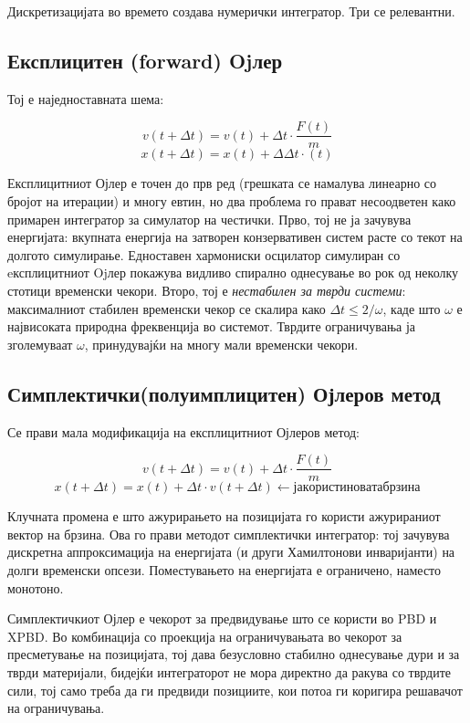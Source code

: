 Дискретизацијата во времето создава нумерички интегратор. Три се релевантни.

\subsection{Експлицитен (forward) Ojлер}
Тој е наједноставната шема:

$$v(t + \Delta t) = v(t) + \Delta t \cdot \frac{F(t)}{m}$$
$$x(t + \Delta t) = x(t) + \Delta Δt \cdot (t)$$

Експлицитниот Ојлер е точен до прв ред (грешката се намалува линеарно со бројот на итерации) и многу евтин, но два проблема го прават несоодветен како примарен интегратор за симулатор на честички. Прво, тој не ја зачувува енергијата: вкупната енергија на затворен конзервативен систем расте со текот на долгото симулирање. Едноставен хармониски осцилатор симулиран со eксплицитниот Ojлер покажува видливо спирално однесување во рок од неколку стотици временски чекори. Второ, тој е \textit{нестабилен за тврди системи}: максималниот стабилен временски чекор се скалира како $\Delta t \leq 2/ω$, каде што $\omega$ е највисоката природна фреквенција во системот. Тврдите ограничувања ја зголемуваат $\omega$, принудувајќи на многу мали временски чекори.

\subsection{Симплектички(полуимплицитен) Ојлеров метод}

Се прави мала модификација на експлицитниот Ојлеров метод:

$$v(t + Δt) = v(t) + \Delta t \cdot \frac{F(t)}{m}$$
$$x(t + Δt) = x(t) + \Delta t · v(t + \Delta t) ← ја користи новата брзина$$

Клучната промена е што ажурирањето на позицијата го користи ажурираниот вектор на брзина. Ова го прави методот симплектички интегратор: тој зачувува дискретна аппроксимација на енергијата (и други Хамилтонови инваријанти) на долги временски опсези. Поместувањето на енергијата е ограничено, наместо монотоно.

Симплектичкиот Ојлер е чекорот за предвидување што се користи во PBD и XPBD. Во комбинација со проекција на ограничувањата во чекорот за пресметување на позицијата, тој дава безусловно стабилно однесување дури и за тврди материјали, бидејќи интеграторот не мора директно да ракува со тврдите сили, тој само треба да ги предвиди позициите, кои потоа ги коригира решавачот на ограничувања.

